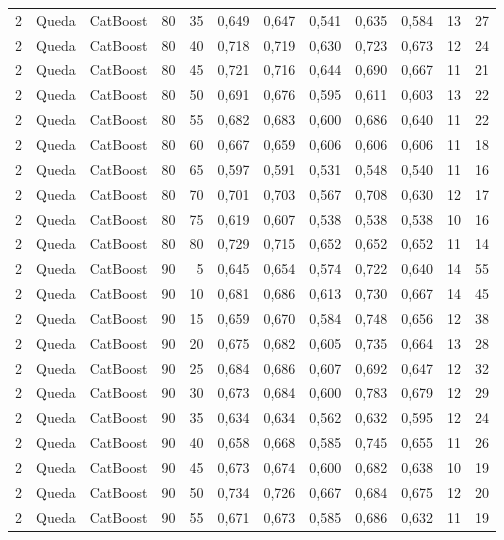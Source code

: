 \begin{longtable}{@{}rllrrrrrrrrr@{}}
2 & Queda & CatBoost & 80 & 35 & 0,649 & 0,647 & 0,541 & 0,635 & 0,584 & 13 & 27 \\
2 & Queda & CatBoost & 80 & 40 & 0,718 & 0,719 & 0,630 & 0,723 & 0,673 & 12 & 24 \\
2 & Queda & CatBoost & 80 & 45 & 0,721 & 0,716 & 0,644 & 0,690 & 0,667 & 11 & 21 \\
2 & Queda & CatBoost & 80 & 50 & 0,691 & 0,676 & 0,595 & 0,611 & 0,603 & 13 & 22 \\
2 & Queda & CatBoost & 80 & 55 & 0,682 & 0,683 & 0,600 & 0,686 & 0,640 & 11 & 22 \\
2 & Queda & CatBoost & 80 & 60 & 0,667 & 0,659 & 0,606 & 0,606 & 0,606 & 11 & 18 \\
2 & Queda & CatBoost & 80 & 65 & 0,597 & 0,591 & 0,531 & 0,548 & 0,540 & 11 & 16 \\
2 & Queda & CatBoost & 80 & 70 & 0,701 & 0,703 & 0,567 & 0,708 & 0,630 & 12 & 17 \\
2 & Queda & CatBoost & 80 & 75 & 0,619 & 0,607 & 0,538 & 0,538 & 0,538 & 10 & 16 \\
2 & Queda & CatBoost & 80 & 80 & 0,729 & 0,715 & 0,652 & 0,652 & 0,652 & 11 & 14 \\
2 & Queda & CatBoost & 90 & 5 & 0,645 & 0,654 & 0,574 & 0,722 & 0,640 & 14 & 55 \\
2 & Queda & CatBoost & 90 & 10 & 0,681 & 0,686 & 0,613 & 0,730 & 0,667 & 14 & 45 \\
2 & Queda & CatBoost & 90 & 15 & 0,659 & 0,670 & 0,584 & 0,748 & 0,656 & 12 & 38 \\
2 & Queda & CatBoost & 90 & 20 & 0,675 & 0,682 & 0,605 & 0,735 & 0,664 & 13 & 28 \\
2 & Queda & CatBoost & 90 & 25 & 0,684 & 0,686 & 0,607 & 0,692 & 0,647 & 12 & 32 \\
2 & Queda & CatBoost & 90 & 30 & 0,673 & 0,684 & 0,600 & 0,783 & 0,679 & 12 & 29 \\
2 & Queda & CatBoost & 90 & 35 & 0,634 & 0,634 & 0,562 & 0,632 & 0,595 & 12 & 24 \\
2 & Queda & CatBoost & 90 & 40 & 0,658 & 0,668 & 0,585 & 0,745 & 0,655 & 11 & 26 \\
2 & Queda & CatBoost & 90 & 45 & 0,673 & 0,674 & 0,600 & 0,682 & 0,638 & 10 & 19 \\
2 & Queda & CatBoost & 90 & 50 & 0,734 & 0,726 & 0,667 & 0,684 & 0,675 & 12 & 20 \\
2 & Queda & CatBoost & 90 & 55 & 0,671 & 0,673 & 0,585 & 0,686 & 0,632 & 11 & 19 \\

\end{longtable}
